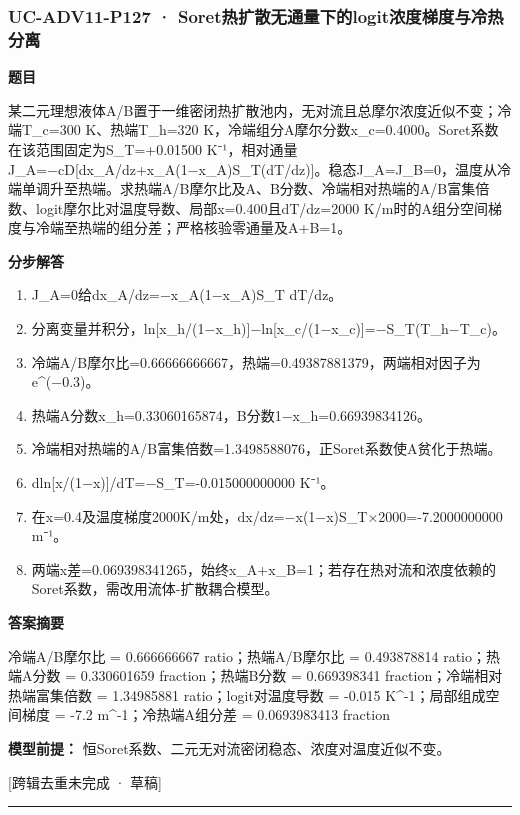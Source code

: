 \documentclass[UTF8,11pt,a4paper]{ctexart}
\begin{document}
\subsubsection*{UC-ADV11-P127 · Soret热扩散无通量下的logit浓度梯度与冷热分离}
\noindent\textbf{题目}\par
某二元理想液体A/B置于一维密闭热扩散池内，无对流且总摩尔浓度近似不变；冷端T\_c=300 K、热端T\_h=320 K，冷端组分A摩尔分数x\_c=0.4000。Soret系数在该范围固定为S\_T=+0.01500 K⁻¹，相对通量J\_A=−cD[dx\_A/dz+x\_A(1−x\_A)S\_T(dT/dz)]。稳态J\_A=J\_B=0，温度从冷端单调升至热端。求热端A/B摩尔比及A、B分数、冷端相对热端的A/B富集倍数、logit摩尔比对温度导数、局部x=0.400且dT/dz=2000 K/m时的A组分空间梯度与冷端至热端的组分差；严格核验零通量及A+B=1。\par
\medskip\noindent\textbf{分步解答}
\begin{enumerate}
\item J\_A=0给dx\_A/dz=−x\_A(1−x\_A)S\_T dT/dz。
\item 分离变量并积分，ln[x\_h/(1−x\_h)]−ln[x\_c/(1−x\_c)]=−S\_T(T\_h−T\_c)。
\item 冷端A/B摩尔比=0.66666666667，热端=0.49387881379，两端相对因子为e\textasciicircum{}(−0.3)。
\item 热端A分数x\_h=0.33060165874，B分数1−x\_h=0.66939834126。
\item 冷端相对热端的A/B富集倍数=1.3498588076，正Soret系数使A贫化于热端。
\item dln[x/(1−x)]/dT=−S\_T=-0.015000000000 K⁻¹。
\item 在x=0.4及温度梯度2000K/m处，dx/dz=−x(1−x)S\_T×2000=-7.2000000000 m⁻¹。
\item 两端x差=0.069398341265，始终x\_A+x\_B=1；若存在热对流和浓度依赖的Soret系数，需改用流体-扩散耦合模型。
\end{enumerate}
\noindent\textbf{答案摘要}\par
冷端A/B摩尔比 = 0.666666667 ratio；热端A/B摩尔比 = 0.493878814 ratio；热端A分数 = 0.330601659 fraction；热端B分数 = 0.669398341 fraction；冷端相对热端富集倍数 = 1.34985881 ratio；logit对温度导数 = -0.015 K\textasciicircum{}-1；局部组成空间梯度 = -7.2 m\textasciicircum{}-1；冷热端A组分差 = 0.0693983413 fraction\par
\noindent\textbf{模型前提：}
恒Soret系数、二元无对流密闭稳态、浓度对温度近似不变。\par
\noindent\textcolor{red!65!black}{[跨辑去重未完成 · 草稿]} \par
\medskip\hrule\medskip
{}
\end{document}
